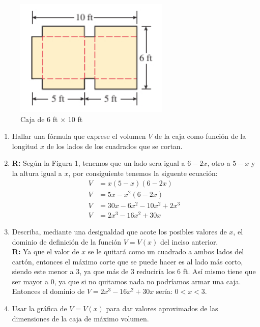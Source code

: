 \documentclass[12pt]{article}
\begin{document}
\begin{figure}[h]
    \centering
    \includegraphics{caja.png}
    \caption{ Caja de 6 ft $\times$ 10 ft}
\end{figure}

\begin{enumerate}
    \item Hallar una fórmula que exprese el volumen \( V \) de la caja como función de la longitud \( x \) de los lados de los cuadrados que se cortan.\\
    
    \item 
    {\bf R:} Según la Figura 1, tenemos que un lado sera igual a $6-2x$, otro a $5-x$ y la altura igual a $x$, por consiguiente tenemos la siguente ecuación:
    \begin{align*}
    V&=x(5-x)(6-2x)\\
    V&=5x-x^2(6-2x)\\
    V&=30x-6x^2-10x^2+2x^3\\
    V&=2x^3-16x^2+30x
    \end{align*}
    
    \item Describa, mediante una desigualdad que acote los posibles valores de \( x \), el dominio de definición de la función \( V = V(x) \) del inciso anterior.\\
    
    
    {\bf R:} Ya que el valor de $x$ se le quitará como un cuadrado a ambos lados del cartón, entonces el máximo corte que se puede hacer es al lado más corto, siendo este menor a 3, ya que más de 3 reduciría los 6 ft. Así mismo tiene que ser mayor a 0, ya que si no quitamos nada no podríamos armar una caja. Entonces el dominio de $V=2x^3-16x^2+30x$ sería: $0<x<3$.
    
    \item Usar la gráfica de \( V = V(x) \) para dar valores aproximados de las dimensiones de la caja de máximo volumen.\\
    

\end{enumerate}
\end{document}
